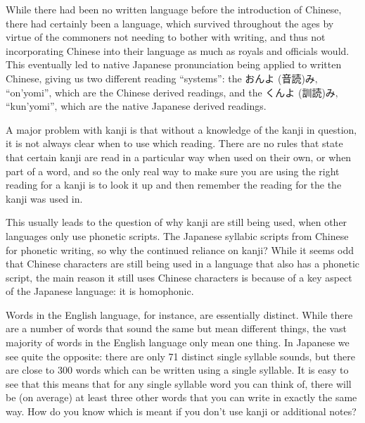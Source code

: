 \documentclass[11pt, b5paper, twoside, openright, onecolumn]{book}
\makeatletter
\newcommand*{\rubystack}[2]{{\relscale{0.5}%
  \begin{tabular}[b]{@{}c@{}}%
    {#1}\\%
   {\textscale{2}{#2}}%
  \end{tabular}}%
}
\DeclareRobustCommand*{\ruby}[2]{%
  \mbox{%
    \setlength{\parskip}{0ex}%
    \BeginAccSupp{method=pdfstringdef,ActualText={#1}}%
      \rubystack{\phantom{#2}}{#1}%
      \llap{%
        \rubystack{#2}{\phantom{#1}}%
      }%
    \EndAccSupp{}%
  }%
}
\renewcommand*{\ruby}[2]{#2 (#1)}%
\makeatother
\begin{document}
While there had been no written language before the introduction of Chinese‚ there had certainly been a language‚ which survived throughout the ages by virtue of the commoners not needing to bother with writing‚ and thus not incorporating Chinese into their language as much as royals and officials would. This eventually led to native Japanese pronunciation being applied to written Chinese‚ giving us two different reading “systems”: the \ruby{音読}{おんよ}み‚ “on’yomi”‚ which are the Chinese derived readings‚ and the \ruby{訓読}{くんよ}み‚ “kun’yomi”‚ which are the native Japanese derived readings.

A major problem with kanji is that without a knowledge of the kanji in question‚ it is not always clear when to use which reading. There are no rules that state that certain kanji are read in a particular way when used on their own‚ or when part of a word‚ and so the only real way to make sure you are using the right reading for a kanji is to look it up and then remember the reading for the  the kanji was used in.

This usually leads to the question of why kanji are still being used‚ when other languages only use phonetic scripts. The Japanese  syllabic scripts from Chinese for phonetic writing‚ so why the continued reliance on kanji? While it seems odd that Chinese characters are still being used in a language that also has a phonetic script‚ the main reason it still uses Chinese characters is because of a key aspect of the Japanese language: it is homophonic.

Words in the English language‚ for instance‚ are essentially distinct. While there are a number of words that sound the same but mean different things‚ the vast majority of words in the English language only mean one thing. In Japanese we see quite the opposite: there are only 71 distinct single syllable sounds‚ but there are close to 300 words which can be written using a single syllable. It is easy to see that this means that for any single syllable word you can think of‚ there will be (on average) at least three other words that you can write in exactly the same way. How do you know which is meant if you don’t use kanji or additional notes?
\end{document}
